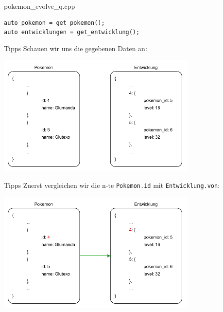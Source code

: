 \begin{frame}[fragile]{pokemon\_evolve\_q.cpp}
    \begin{verbatim}
auto pokemon = get_pokemon();
auto entwicklungen = get_entwicklung();
    \end{verbatim}
\end{frame}

\begin{frame}{Tipps}
    Schauen wir uns die gegebenen Daten an:

    \begin{center}
        \includegraphics[width=0.75\textwidth]{pictures/example_1.pdf}
    \end{center}
\end{frame}

\begin{frame}{Tipps}
    Zuerst vergleichen wir die n-te \texttt{Pokemon.id} mit \texttt{Entwicklung.von}:

    \begin{center}
        \includegraphics[width=0.75\textwidth]{pictures/example_2.pdf}
    \end{center}
\end{frame}

